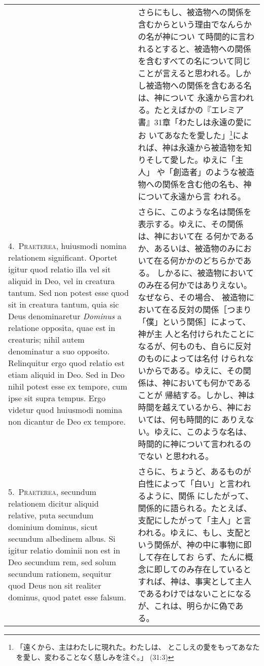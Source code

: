 \documentclass[paper=a4paper,fontsize=10pt,jafontsize=9pt,titlepage]{jlreq}
\begin{document}
\begin{longtable}{p{21em}p{21em}}
&

さらにもし、被造物への関係を含むからという理由でなんらかの名が神につい
て時間的に言われるとすると、被造物への関係を含むすべての名について同じ
ことが言えると思われる。しかし被造物への関係を含むある名は、神について
永遠から言われる。たとえばかの『エレミア書』31章「わたしは永遠の愛にお
いてあなたを愛した」\footnote{「遠くから、主はわたしに現れた。わたしは、
とこしえの愛をもってあなたを愛し、変わることなく慈しみを注ぐ。」
(31:3)}によれば、神は永遠から被造物を知りそして愛した。ゆえに「主人」
や「創造者」のような被造物への関係を含む他の名も、神について永遠から言
われる。

\\

4.~{\scshape Praeterea}, huiusmodi nomina relationem
significant. Oportet igitur quod relatio illa vel sit aliquid in Deo,
vel in creatura tantum. Sed non potest esse quod sit in creatura
tantum, quia sic Deus denominaretur {\itshape Dominus} a relatione
opposita, quae est in creaturis; nihil autem denominatur a suo
opposito. Relinquitur ergo quod relatio est etiam aliquid in Deo. Sed
in Deo nihil potest esse ex tempore, cum ipse sit supra tempus. Ergo
videtur quod huiusmodi nomina non dicantur de Deo ex tempore.

&

さらに、このような名は関係を表示する。ゆえに、その関係は、神において在
る何かであるか、あるいは、被造物のみにおいて在る何かかのどちらかである。
しかるに、被造物においてのみ在る何かではありえない。なぜなら、その場合、
被造物において在る反対の関係［つまり「僕」という関係］によって、神が主
人と名付けられたことになるが、何ものも、自らに反対のものによっては名付
けられないからである。ゆえに、その関係は、神においても何かであることが
帰結する。しかし、神は時間を越えているから、神においては、何も時間的に
ありえない。ゆえに、このような名は、時間的に神について言われるのでない
と思われる。

\\

5.~{\scshape Praeterea}, secundum relationem dicitur aliquid relative,
puta secundum dominium dominus, sicut secundum albedinem albus. Si
igitur relatio dominii non est in Deo secundum rem, sed solum secundum
rationem, sequitur quod Deus non sit realiter dominus, quod patet esse
falsum.

&

さらに、ちょうど、あるものが白性によって「白い」と言われるように、関係
にしたがって、関係的に語られる。たとえば、支配にしたがって「主人」と言
われる。ゆえに、もし、支配という関係が、神の中に事物に即して存在してお
らず、たんに概念に即してのみ存在しているとすれば、神は、事実として主人
であるわけではないことになるが、これは、明らかに偽である。


\end{longtable}
\end{document}
